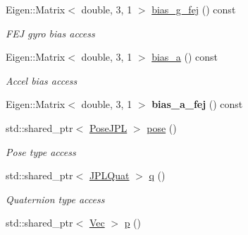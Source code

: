 \begin{DoxyCompactItemize}
\mbox{\label{classov__type_1_1IMU_a4d547e3f63e1bd054b486709d64b0ffd}} 
Eigen\+::\+Matrix$<$ double, 3, 1 $>$ \hyperlink{classov__type_1_1IMU_a4d547e3f63e1bd054b486709d64b0ffd}{bias\+\_\+g\+\_\+fej} () const
\begin{DoxyCompactList}\small\item\em F\+EJ gyro bias access \end{DoxyCompactList}\item 
\mbox{\label{classov__type_1_1IMU_a672ba68b2506a3d225bb6da4e5b4d93f}} 
Eigen\+::\+Matrix$<$ double, 3, 1 $>$ \hyperlink{classov__type_1_1IMU_a672ba68b2506a3d225bb6da4e5b4d93f}{bias\+\_\+a} () const
\begin{DoxyCompactList}\small\item\em Accel bias access \end{DoxyCompactList}\item 
\mbox{\label{classov__type_1_1IMU_adda8baa965ceb0e6e4f0d7e47cf9875d}} 
Eigen\+::\+Matrix$<$ double, 3, 1 $>$ {\bfseries bias\+\_\+a\+\_\+fej} () const
\item 
\mbox{\label{classov__type_1_1IMU_aa083ef7c5392ee0da48ba77c5093bee2}} 
std\+::shared\+\_\+ptr$<$ \hyperlink{classov__type_1_1PoseJPL}{Pose\+J\+PL} $>$ \hyperlink{classov__type_1_1IMU_aa083ef7c5392ee0da48ba77c5093bee2}{pose} ()
\begin{DoxyCompactList}\small\item\em Pose type access \end{DoxyCompactList}\item 
\mbox{\label{classov__type_1_1IMU_ac1f6387823cd403da8abbb84ce4368fb}} 
std\+::shared\+\_\+ptr$<$ \hyperlink{classov__type_1_1JPLQuat}{J\+P\+L\+Quat} $>$ \hyperlink{classov__type_1_1IMU_ac1f6387823cd403da8abbb84ce4368fb}{q} ()
\begin{DoxyCompactList}\small\item\em Quaternion type access \end{DoxyCompactList}\item 
\mbox{\label{classov__type_1_1IMU_a6f70d8ea8f21a8e47be71cd77443d153}} 
std\+::shared\+\_\+ptr$<$ \hyperlink{classov__type_1_1Vec}{Vec} $>$ \hyperlink{classov__type_1_1IMU_a6f70d8ea8f21a8e47be71cd77443d153}{p} ()

\end{DoxyCompactItemize}
